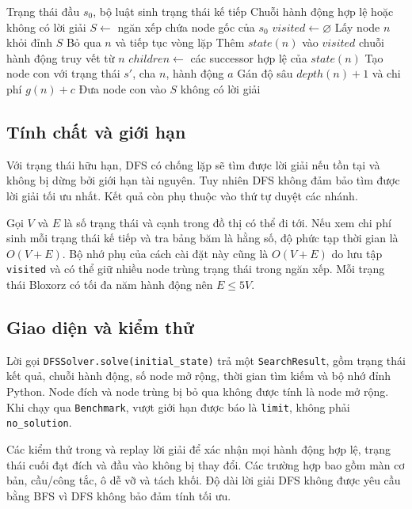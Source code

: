 \begin{algorithm}[htbp]
    \caption{Thuật toán DFS}
    \label{alg:dfs}
    \begin{algorithmic}[1]
        \Require Trạng thái đầu $s_0$, bộ luật sinh trạng thái kế tiếp
        \Ensure Chuỗi hành động hợp lệ hoặc không có lời giải
        \State $S \gets$ ngăn xếp chứa node gốc của $s_0$
        \State $visited \gets \varnothing$
            \State Lấy node $n$ khỏi đỉnh $S$
                \State Bỏ qua $n$ và tiếp tục vòng lặp
            \Else
                \State Thêm $state(n)$ vào $visited$
                    \State \Return chuỗi hành động truy vết từ $n$
                \EndIf
                \State $children \gets$ các successor hợp lệ của $state(n)$
                        \State Tạo node con với trạng thái $s'$, cha $n$, hành động $a$
                        \State Gán độ sâu $depth(n)+1$ và chi phí $g(n)+c$
                        \State Đưa node con vào $S$
                    \EndIf
                \EndFor
            \EndIf
        \EndWhile
        \State \Return không có lời giải
    \end{algorithmic}
\end{algorithm}

\subsection{Tính chất và giới hạn}
Với trạng thái hữu hạn, DFS có chống lặp sẽ tìm được lời giải nếu tồn tại và không bị dừng bởi giới hạn tài nguyên. Tuy nhiên DFS không
đảm bảo tìm được lời giải tối ưu nhất. Kết quả còn phụ thuộc vào thứ tự duyệt các nhánh.

Gọi $V$ và $E$ là số trạng thái và cạnh trong đồ thị có thể đi tới.
Nếu xem chi phí sinh mỗi trạng thái kế tiếp và tra bảng băm là hằng số,
độ phức tạp thời gian là $O(V+E)$. Bộ nhớ phụ của cách cài đặt này
cũng là $O(V+E)$ do lưu tập \texttt{visited} và có thể giữ nhiều node
trùng trạng thái trong ngăn xếp. Mỗi trạng thái Bloxorz có tối đa
năm hành động nên $E \leq 5V$.

\subsection{Giao diện và kiểm thử}
Lời gọi \texttt{DFSSolver.solve(initial\_state)} trả một
\texttt{SearchResult}, gồm trạng thái kết quả, chuỗi hành động,
số node mở rộng, thời gian tìm kiếm và bộ nhớ đỉnh Python.
Node đích và node trùng bị bỏ qua không được tính là node mở rộng.
Khi chạy qua \texttt{Benchmark}, vượt giới hạn được báo là
\texttt{limit}, không phải \texttt{no\_solution}.

Các kiểm thử trong  và
 replay lời giải để xác nhận mọi
hành động hợp lệ, trạng thái cuối đạt đích và đầu vào không bị
thay đổi. Các trường hợp bao gồm màn cơ bản, cầu/công tắc,
ô dễ vỡ và tách khối. Độ dài lời giải DFS không được yêu cầu
bằng BFS vì DFS không bảo đảm tính tối ưu.
